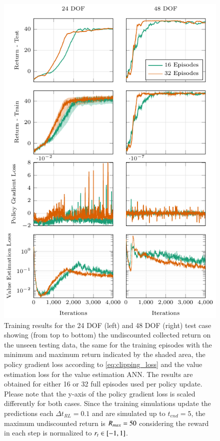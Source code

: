 \begin{figure}[htb!]
  \centering
  \includegraphics[width=0.99\linewidth]{tikz_double_column/draft-figure2.pdf}
  \caption{Training results for the 24 DOF (left) and 48 DOF (right) test case showing (from top to bottom) the undiscounted collected return on the unseen testing data, the same for the training episodes with the minimum and maximum return indicated by the shaded area, the policy gradient loss according to \eqref{eq:clipping_loss} and the value estimation loss for the value estimation ANN. The results are obtained for either 16 or 32 full episodes used per policy update. Please note that the y-axis of the policy gradient loss is scaled differently for both cases. Since the training simulations update the predictions each $\Delta t_{RL}=0.1$ and are simulated up to $t_{end}=5$, the maximum undiscounted return is $R_{max}=50$ considering the reward in each step is normalized to $r_t\in[-1,1]$.}
  \label{fig:results_training}
\end{figure}


